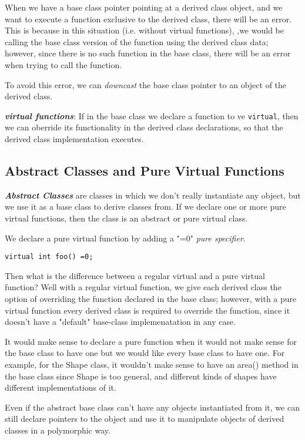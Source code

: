 \documentclass{article}
\begin{document}
When we have a base class pointer pointing at a derived class object, and we want to execute a function
exclusive to the derived class, there will be an error. This is because in this situation (i.e. without virtual 
functions), ,we would be calling the base class version of the function using the derived class data; however, 
since there is no such function in the base class, there will be an error when trying to call the function.

To avoid this error, we can \textit{downcast} the base class pointer to an object of the derived class. 

\textbf{\textit{virtual functions}}: If in the base class we declare a function to ve \texttt{virtual}, then 
we can oberride its functionality in the derived class declarations, so that the derived class implementation
executes.
\subsection{Abstract Classes and Pure Virtual Functions}
\textbf{\textit{Abstract Classes}} are classes in which we don't really instantiate any object, but we use it 
as a base class to derive classes from. If we declare one or more pure virtual functions, then the class is an
abstract or pure virtual class.

We declare a pure virtual function by adding a "=0" \textit{pure specifier}. 
\begin{verbatim}
virtual int foo() =0;
\end{verbatim}
Then what is the difference between a regular virtual and a pure virtual function? Well with a regular virtual 
function, we give each derived class the option of overriding the function declared in the base class; however,
with a pure virtual function every derived class is required to override the function, since it doesn't have a
"default" base-class implemenatation in any case. 

It would make sense to declare a pure function when it would not make sense for the base class to have one but 
we would like every base class to have one. For example, for the Shape class, it wouldn't make sense to 
have an area() method in the base class since Shape is too general, and different kinds of shapes have different
implementations of it.

Even if the abstract base class can't have any objects instantiated from it, we can still declare pointers to 
the object and use it to manipulate objects of derived classes in a polymorphic way.
\end{document}
